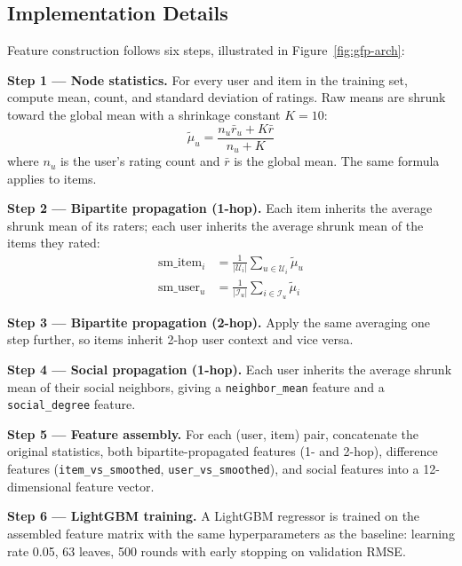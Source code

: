 \documentclass[conference]{IEEEtran}
\begin{document}
\subsection{Implementation Details}

Feature construction follows six steps, illustrated in 
Figure~\ref{fig:gfp-arch}:

\textbf{Step 1 --- Node statistics.} For every user and item in the training 
set, compute mean, count, and standard deviation of ratings. Raw means are 
shrunk toward the global mean with a shrinkage constant $K = 10$:
\begin{equation}
  \tilde{\mu}_u = \frac{n_u \bar{r}_u + K \bar{r}}{n_u + K}
\end{equation}
where $n_u$ is the user's rating count and $\bar{r}$ is the global mean.
The same formula applies to items.

\textbf{Step 2 --- Bipartite propagation (1-hop).} Each item inherits the 
average shrunk mean of its raters; each user inherits the average shrunk mean 
of the items they rated:
\begin{align}
  \text{sm\_item}_i &= \frac{1}{|\mathcal{U}_i|}\sum_{u \in \mathcal{U}_i} \tilde{\mu}_u \\
  \text{sm\_user}_u &= \frac{1}{|\mathcal{I}_u|}\sum_{i \in \mathcal{I}_u} \tilde{\mu}_i
\end{align}

\textbf{Step 3 --- Bipartite propagation (2-hop).} Apply the same averaging 
one step further, so items inherit 2-hop user context and vice versa.

\textbf{Step 4 --- Social propagation (1-hop).} Each user inherits the average 
shrunk mean of their social neighbors, giving a \texttt{neighbor\_mean} feature 
and a \texttt{social\_degree} feature.

\textbf{Step 5 --- Feature assembly.} For each (user, item) pair, concatenate 
the original statistics, both bipartite-propagated features (1- and 2-hop), 
difference features (\texttt{item\_vs\_smoothed}, \texttt{user\_vs\_smoothed}), 
and social features into a 12-dimensional feature vector.

\textbf{Step 6 --- LightGBM training.} A LightGBM regressor is trained on the 
assembled feature matrix with the same hyperparameters as the baseline: 
learning rate 0.05, 63 leaves, 500 rounds with early stopping on validation 
RMSE.
\end{document}
